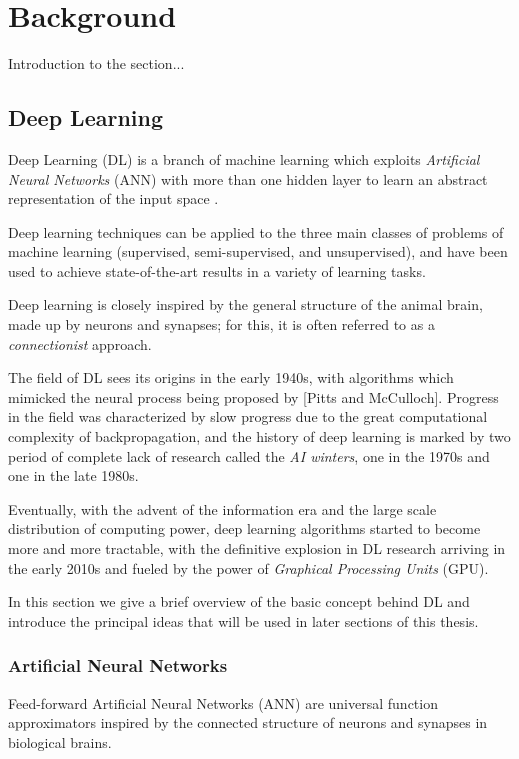 \chapter{Background}
\label{ch1_intro}
\thispagestyle{empty}

\vspace{0.5cm}

\noindent Introduction to the section...

\section{Deep Learning} \label{s:DL}
Deep Learning (DL) is a branch of machine learning which exploits \textit{Artificial 
Neural Networks} (ANN) with more than one hidden layer to learn an abstract 
representation of the input space \cite{lecun2015deep}. 

Deep learning techniques can be applied to the three main classes of problems 
of machine learning (supervised, semi-supervised, and unsupervised), and have 
been used to achieve state-of-the-art results in a variety of learning tasks.

Deep learning is closely inspired by the general structure of the animal brain, 
made up by neurons and synapses; for this, it is often referred to as a 
\textit{connectionist} approach. 

The field of DL sees its origins in the early 1940s, with algorithms which 
mimicked the neural process being proposed by [Pitts and McCulloch]. 
Progress in the field was characterized by slow progress due to the great
computational complexity of backpropagation, and the history of deep learning 
is marked by two period of complete lack of research called the \textit{AI
winters}, one in the 1970s and one in the late 1980s. 

Eventually, with the advent of the information era and the large scale 
distribution of computing power, deep learning algorithms started to become 
more and more tractable, with the definitive explosion in DL research arriving
in the early 2010s and fueled by the power of \textit{Graphical Processing 
Units} (GPU).

In this section we give a brief overview of the basic concept behind DL and
introduce the principal ideas that will be used in later sections of this thesis.

\subsection{Artificial Neural Networks}
Feed-forward Artificial Neural Networks (ANN) are universal function approximators 
inspired by the connected structure of neurons and synapses in biological brains.

